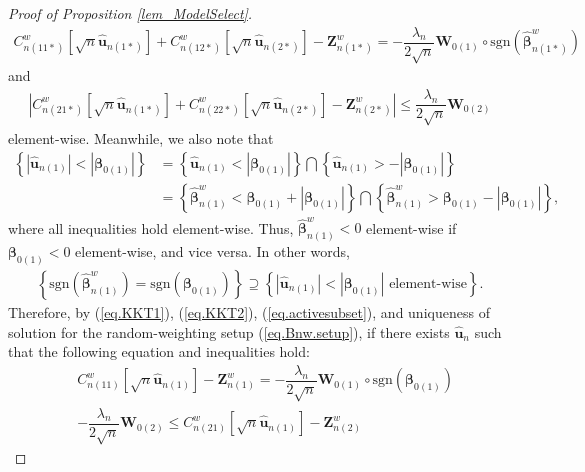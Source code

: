 \documentclass[ejs,authoryear,linksfromyear]{imsart}
\newcommand{\cnwa}{C_{n(11)}^w}
\newcommand{\cnwc}{C_{n(21)}^w}
\newcommand{\znwa}{\bm{Z}_{n(1)}^w}
\newcommand{\znwb}{\bm{Z}_{n(2)}^w}
\newcommand{\huna}{\widehat{\bm{u}}_{n(1)}}
\newcommand{\cnwas}{C_{n(11*)}^w}
\newcommand{\cnwbs}{C_{n(12*)}^w}
\newcommand{\cnwcs}{C_{n(21*)}^w}
\newcommand{\cnwds}{C_{n(22*)}^w}
\newcommand{\znwas}{\bm{Z}_{n(1*)}^w}
\newcommand{\znwbs}{\bm{Z}_{n(2*)}^w}
\newcommand{\hunas}{\widehat{\bm{u}}_{n(1*)}}
\newcommand{\hunbs}{\widehat{\bm{u}}_{n(2*)}}
\numberwithin{equation}{section}
\theoremstyle{plain}
\begin{document}
\begin{proof}[Proof of Proposition \ref{lem_ModelSelect}]
	 \begin{align} \label{eq.KKT1}
	 \cnwas \left[\sqrt{n} \hunas \right] 
	 + \cnwbs \left[\sqrt{n} \hunbs \right] 
	 - \znwas
	 = - \dfrac{\lambda_n}{ 2 \sqrt{n} }
	 \bm{W}_{0(1)} \circ
	 \text{sgn} \left( \widehat{\bm{\beta}}^w_{n(1*)} \right) 
	 \end{align}
	 and
	 \begin{align} \label{eq.KKT2}
	 \left|
	 \cnwcs \left[ \sqrt{n} \hunas \right]
	 + \cnwds \left[ \sqrt{n} \hunbs \right]
	 - \znwbs
	 \right|
	 \leq \dfrac{\lambda_n}{2 \sqrt{n}} 
	 \bm{W}_{0(2)}
	 \end{align}
	 element-wise. Meanwhile, we also note that
	 \begin{align*}
	 \left\{
	 \left\vert \widehat{\bm{u}}_{n(1)} \right\vert
	 <  \left\vert \bm{\beta}_{0(1)} \right\vert
	 \right\} 
	 &=
	 \left\{
	 \widehat{\bm{u}}_{n(1)} 
	 < \left\vert \bm{\beta}_{0(1)} \right\vert
	 \right\}
	 \bigcap
	 \left\{
	 \widehat{\bm{u}}_{n(1)} 
	 > - \left\vert \bm{\beta}_{0(1)} \right\vert
	 \right\} \\
	 &=
	 \left\{
	 \widehat{\bm{\beta}}^w_{n(1)} 
	 < \bm{\beta}_{0(1)}
	 + \left\vert \bm{\beta}_{0(1)} \right\vert
	 \right\}
	 \bigcap
	 \left\{
	 \widehat{\bm{\beta}}^w_{n(1)} 
	 > \bm{\beta}_{0(1)}
	 - \left\vert \bm{\beta}_{0(1)} \right\vert
	 \right\},
	 \end{align*}
	 where all inequalities hold element-wise. Thus, $\widehat{\bm{\beta}}^w_{n(1)} < 0$ element-wise if $\bm{\beta}_{0(1)} < 0$ element-wise, and vice versa. In other words,
	 \begin{align} \label{eq.activesubset}
	 \left\{
	 \text{sgn} \left( \widehat{\bm{\beta}}^w_{n(1)} \right)
	 = \text{sgn} \left( \bm{\beta}_{0(1)} \right)
	 \right\}
	 \supseteq
	 \left\{
	 \left\vert \widehat{\bm{u}}_{n(1)} \right\vert
	 <  \left\vert \bm{\beta}_{0(1)} \right\vert
	 \text{ element-wise}
	 \right\}.
	 \end{align}
	 Therefore, by (\ref{eq.KKT1}), (\ref{eq.KKT2}), (\ref{eq.activesubset}), and uniqueness of solution for the random-weighting setup (\ref{eq.Bnw.setup}), if there exists $\widehat{\bm{u}}_n$ such that the following equation and inequalities hold:
	 	\begin{align}
	 &\cnwa \left[ \sqrt{n} \huna \right] - \znwa 
	 = - \dfrac{\lambda_n}{2 \sqrt{n}}
	 \bm{W}_{0(1)} \circ
	 \text{sgn} \left( \bm{\beta}_{0(1)} \right) \label{eq.ineq.1} \\
	 &- \dfrac{\lambda_n}{2 \sqrt{n}} \bm{W}_{0(2)} \leq
	 \cnwc \left[ \sqrt{n} \huna \right] - \znwb 

\end{align}
\end{proof}
\end{document}
